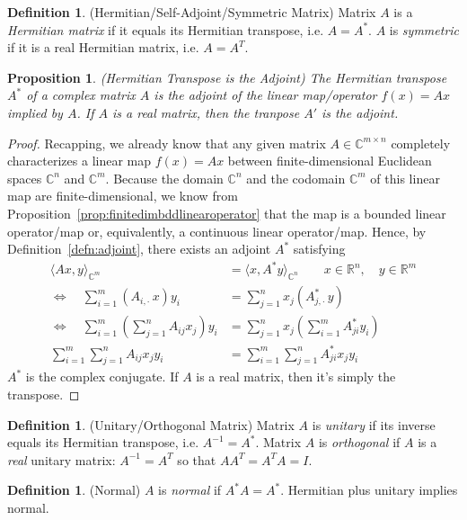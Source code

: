 \documentclass[12pt]{book}
\numberwithin{equation}{section} %
\theoremstyle{plain}
\newtheorem{prop}[thm]{Proposition}
\theoremstyle{definition}
\newtheorem{defn}[thm]{Definition}
\theoremstyle{remark}
\newcommand{\Rn}{\mathbb{R}^n}
\newcommand{\Rm}{\mathbb{R}^m}
\newcommand{\Cn}{\mathbb{C}^n}
\newcommand{\Cm}{\mathbb{C}^m}
\newcommand{\Cmn}{\mathbb{C}^{m\times n}}
\begin{document}
\begin{defn}{(Hermitian/Self-Adjoint/Symmetric Matrix)}
Matrix $A$ is a \emph{Hermitian matrix} if it equals its Hermitian
transpose, i.e. $A=A^*$.
$A$ is \emph{symmetric} if it is a real Hermitian matrix, i.e.
$A=A^T$.
\end{defn}


\begin{prop}\emph{(Hermitian Transpose is the Adjoint)}
The Hermitian transpose $A^*$ of a complex matrix $A$ is the adjoint of
the linear map/operator $f(x)=Ax$ implied by $A$.
If $A$ is a real matrix, then the tranpose $A'$ is the adjoint.
\end{prop}
\begin{proof}
Recapping, we already know that any given matrix $A\in\Cmn$ completely
characterizes a linear map $f(x)= Ax$ between finite-dimensional
Euclidean spaces $\Cn$ and $\Cm$.
Because the domain $\Cn$ and the codomain $\Cm$ of this linear map are
finite-dimensional, we know from
Proposition~\ref{prop:finitedimbddlinearoperator} that the map is a
bounded linear operator/map or, equivalently, a continuous linear
operator/map.
Hence, by Definition~\ref{defn:adjoint}, there exists an adjoint $A^*$
satisfying
\begin{align*}
  \langle Ax, y\rangle_{\Cm}
  &= \langle x,A^*y\rangle_{\Cn}
  \qquad
  x\in \Rn,
  \quad
  y\in \Rm
  \\
  \iff
  \quad
  \sum_{i=1}^m
  (A_{i,\cdot}\,x)y_i
  &=
  \sum_{j=1}^n
  x_j (A^*_{j,\cdot}\,y)
  \\
  \iff
  \quad
  \sum_{i=1}^m
  \left(\sum_{j=1}^n A_{ij}x_j\right)y_i
  &=
  \sum_{j=1}^n
  x_j
  \left(
    \sum_{i=1}^m
    A^*_{ji}y_i
  \right)
  \\
  \sum_{i=1}^m
  \sum_{j=1}^n A_{ij}x_jy_i
  &=
  \sum_{i=1}^m
  \sum_{j=1}^n
  A^*_{ji}
  x_j
  y_i
\end{align*}
$A^*$ is the complex conjugate.
If $A$ is a real matrix, then it's simply the transpose.
\end{proof}




\begin{defn}{(Unitary/Orthogonal Matrix)}
Matrix $A$ is \emph{unitary} if its inverse equals its Hermitian
transpose, i.e. $A^{-1} = A^*$.
Matrix $A$ is \emph{orthogonal} if $A$ is a \emph{real} unitary matrix:
$A^{-1} = A^T$ so that $AA^T = A^T A = I$.
\end{defn}

\begin{defn}{(Normal)}
$A$ is \emph{normal} if $A^* A = A^*$. Hermitian plus unitary
implies normal.
\end{defn}
\end{document}
